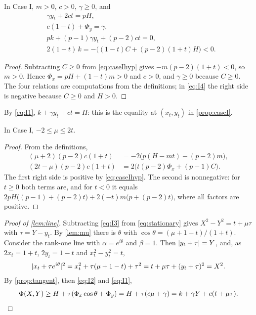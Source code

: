 \begin{lemma}\label{lem:caseI-algebra}
In Case I, $m>0$, $c>0$, $\gamma\ge0$, and
\begin{align}
  &\gamma y_t+2ct=pH,\label{eq:I1}\\
  &c(1-t)+\Phi_y=\gamma,\label{eq:I2}\\
  &pk+(p-1)\gamma y_t+(p-2)ct=0,\label{eq:I3}\\
  &2(1+t)\,k=-\bigl((1-t)C+(p-2)(1+t)H\bigr)<0 .\label{eq:I4}
\end{align}
\end{lemma}

\begin{proof}
Subtracting $C\ge0$ from \eqref{eq:caseIhyp} gives $-m(p-2)(1+t)<0$, so $m>0$. Hence
$\Phi_x=pH+(1-t)m>0$ and $c>0$, and $\gamma\ge0$ because $C\ge0$. The four relations are
computations from the definitions; in \eqref{eq:I4} the right side is negative because $C\ge0$
and $H>0$.
\end{proof}

By \eqref{eq:I1}, $k+\gamma y_t+ct=H$: this is the equality at $(x_t,y_t)$ in
\cref{prop:caseI}.

\begin{lemma}\label{lem:mu}
In Case I, $-2\le\mu\le2t$.
\end{lemma}

\begin{proof}
From the definitions,
\begin{align*}
  (\mu+2)(p-2)c(1+t)&=-2\bigl(p(H-mt)-(p-2)m\bigr),\\
  (2t-\mu)(p-2)c(1+t)&=2\bigl(t(p-2)\Phi_x+(p-1)C\bigr).
\end{align*}
The first right side is positive by \eqref{eq:caseIhyp}. The second is nonnegative: for
$t\ge0$ both terms are, and for $t<0$ it equals
$2pH\bigl((p-1)+(p-2)t\bigr)+2(-t)m\bigl(p+(p-2)t\bigr)$, where all factors are positive.
\end{proof}

\begin{proof}[Proof of \cref{lem:line}]
Subtracting \eqref{eq:I3} from \eqref{eq:stationary} gives $X^2-Y^2=t+\mu\tau$ with
$\tau=Y-y_t$. By \cref{lem:mu} there is $\theta$ with
$\cos\theta=(\mu+1-t)/(1+t)$. Consider the rank-one line with $\alpha=e^{i\theta}$ and
$\beta=1$. Then $\lvert y_t+\tau\rvert=Y$, and, as $2x_t=1+t$, $2y_t=1-t$ and $x_t^2-y_t^2=t$,
\[
  \lvert x_t+\tau e^{i\theta}\rvert^2=x_t^2+\tau(\mu+1-t)+\tau^2=t+\mu\tau+(y_t+\tau)^2=X^2 .
\]
By \cref{prop:tangent}, then \eqref{eq:I2} and \eqref{eq:I1},
\[
  \Phi(X,Y)\ge H+\tau(\Phi_x\cos\theta+\Phi_y)=H+\tau(c\mu+\gamma)
  =k+\gamma Y+c(t+\mu\tau).\qedhere
\]
\end{proof}


